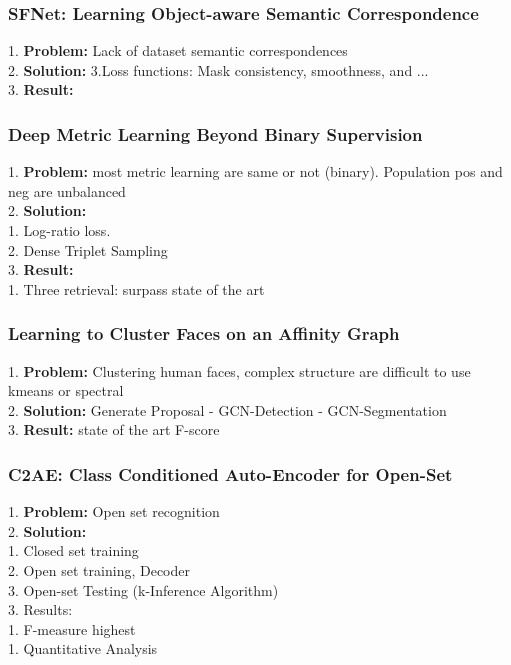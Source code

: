 \subsubsection{SFNet: Learning Object-aware Semantic Correspondence}
    1. {\bf Problem:} Lack of dataset semantic correspondences \\
    2. {\bf Solution:} 3.Loss functions: Mask consistency, smoothness, and ... \\
    3. {\bf Result:}  \\
\subsubsection{Deep Metric Learning Beyond Binary Supervision}
    1. {\bf Problem:} most metric learning are same or not (binary). Population pos and neg are unbalanced \\
    2. {\bf Solution:}  \\
        1. Log-ratio loss. \\
        2. Dense Triplet Sampling \\
    3. {\bf Result:} \\
        1. Three retrieval: surpass state of the art \\
\subsubsection{Learning to Cluster Faces on an Affinity Graph}
    1. {\bf Problem:} Clustering human faces, complex structure are difficult to use kmeans or spectral \\
    2. {\bf Solution:} Generate Proposal - GCN-Detection - GCN-Segmentation \\
    3. {\bf Result:} state of the art F-score \\
\subsubsection{C2AE: Class Conditioned Auto-Encoder for Open-Set}
    1. {\bf Problem:} Open set recognition \\
    2. {\bf Solution:}  \\
        1. Closed set training \\
        2. Open set training, Decoder \\
        3. Open-set Testing (k-Inference Algorithm) \\
    3. Results: \\
        1. F-measure highest \\
            1. Quantitative Analysis \\
